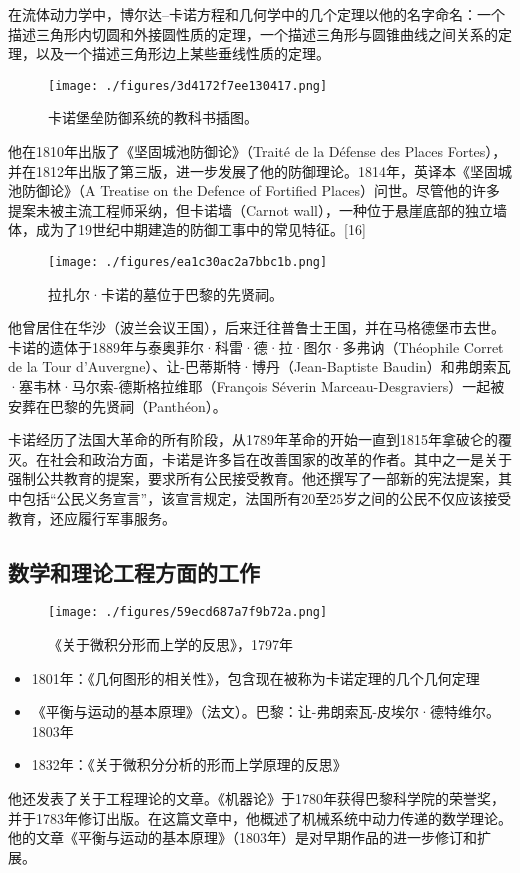 在流体动力学中，博尔达–卡诺方程和几何学中的几个定理以他的名字命名：一个描述三角形内切圆和外接圆性质的定理，一个描述三角形与圆锥曲线之间关系的定理，以及一个描述三角形边上某些垂线性质的定理。
\begin{figure}[ht]
\centering
\texttt{[image: ./figures/3d4172f7ee130417.png]}
\caption{卡诺堡垒防御系统的教科书插图。} \label{fig_Lazare_4}
\end{figure}
他在1810年出版了《坚固城池防御论》（Traité de la Défense des Places Fortes），并在1812年出版了第三版，进一步发展了他的防御理论。1814年，英译本《坚固城池防御论》（A Treatise on the Defence of Fortified Places）问世。尽管他的许多提案未被主流工程师采纳，但卡诺墙（Carnot wall），一种位于悬崖底部的独立墙体，成为了19世纪中期建造的防御工事中的常见特征。[16]
\begin{figure}[ht]
\centering
\texttt{[image: ./figures/ea1c30ac2a7bbc1b.png]}
\caption{拉扎尔·卡诺的墓位于巴黎的先贤祠。} \label{fig_Lazare_5}
\end{figure}
他曾居住在华沙（波兰会议王国），后来迁往普鲁士王国，并在马格德堡市去世。卡诺的遗体于1889年与泰奥菲尔·科雷·德·拉·图尔·多弗讷（Théophile Corret de la Tour d'Auvergne）、让-巴蒂斯特·博丹（Jean-Baptiste Baudin）和弗朗索瓦·塞韦林·马尔索-德斯格拉维耶（François Séverin Marceau-Desgraviers）一起被安葬在巴黎的先贤祠（Panthéon）。

卡诺经历了法国大革命的所有阶段，从1789年革命的开始一直到1815年拿破仑的覆灭。在社会和政治方面，卡诺是许多旨在改善国家的改革的作者。其中之一是关于强制公共教育的提案，要求所有公民接受教育。他还撰写了一部新的宪法提案，其中包括“公民义务宣言”，该宣言规定，法国所有20至25岁之间的公民不仅应该接受教育，还应履行军事服务。
\subsection{数学和理论工程方面的工作}
\begin{figure}[ht]
\centering
\texttt{[image: ./figures/59ecd687a7f9b72a.png]}
\caption{《关于微积分形而上学的反思》，1797年} \label{fig_Lazare_6}
\end{figure}
\begin{itemize}
\item 1801年：《几何图形的相关性》，包含现在被称为卡诺定理的几个几何定理  
\item 《平衡与运动的基本原理》（法文）。巴黎：让-弗朗索瓦-皮埃尔·德特维尔。1803年  
\item 1832年：《关于微积分分析的形而上学原理的反思》
\end{itemize}
他还发表了关于工程理论的文章。《机器论》于1780年获得巴黎科学院的荣誉奖，并于1783年修订出版。在这篇文章中，他概述了机械系统中动力传递的数学理论。他的文章《平衡与运动的基本原理》（1803年）是对早期作品的进一步修订和扩展。

